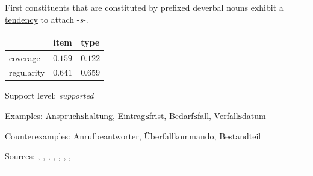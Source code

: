 \noindent
First constituents that are constituted by prefixed deverbal nouns exhibit a \underline{tendency} to attach -\textit{s}-.
\vspace{0.35em}


\vspace{-0.35em}

\begin{table}[!ht]
\begin{center}

\begin{tabularx}{\columnwidth}{|X|X|X|}
\hline
 & item & type \\
\hline
 coverage & $0.159$ & $0.122$ \\
\hline
 regularity & $0.641$ & $0.659$ \\
\hline
\end{tabularx}
\end{center}
\end{table}

\vspace{-1.35em}

\noindent
Support level: \textit{supported}

\vspace{0.3em}

\noindent
Examples: Anspruch\textbf{s}haltung, Eintrag\textbf{s}frist, Bedarf\textbf{s}fall, Verfall\textbf{s}datum

\noindent
Counterexamples: Anruf{\zeroLinker}beantworter, Überfall{\zeroLinker}kommando, Bestand{\zeroLinker}teil

\vspace{0.3em}

\noindent
Sources: \citet[230]{eisenberg_2013}, \citet[61]{koliopoulou_2014}, \citet[107]{kuerschner_2005}, \citet[21]{kuerschner_2010}, \citet[190]{kopf_2017}, \citet[18, 19]{nuebling_szczepaniak_2008}, \citet[78]{nuebling_szczepaniak_2013}, \citet[89]{ortner_mueller-bollhagen_1991}


\hrule





